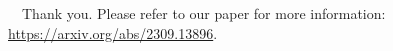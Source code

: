 \documentclass[10pt, xcolor={dvipsnames,x11names},compress]{beamer}
\begin{document}
\begin{frame}
 \begin{center}
		{\Huge \qquad \ \ Thank you.}
		\bigskip\bigskip %
  \newline
        \bigskip Please refer to our paper for more information:\\
        \href{https://arxiv.org/abs/2309.13896}{https://arxiv.org/abs/2309.13896}.
	\end{center}
\end{frame}
\end{document}
